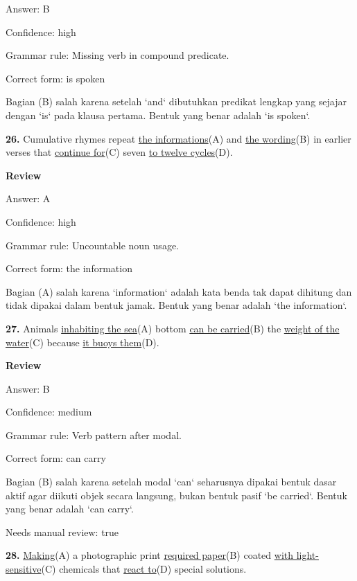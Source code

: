 \documentclass[12pt]{article}
\begin{document}
Answer: B\par
Confidence: high\par
Grammar rule: Missing verb in compound predicate.\par
Correct form: is spoken\par
Bagian (B) salah karena setelah `and` dibutuhkan predikat lengkap yang sejajar dengan `is` pada klausa pertama. Bentuk yang benar adalah `is spoken`.\par
\endgroup
\par
\vspace{\questionblockgap}
\noindent\textbf{26.} Cumulative rhymes repeat \uline{the informations}(A) and \uline{the wording}(B) in earlier verses that \uline{continue for}(C) seven \uline{to twelve cycles}(D).
\par
\begingroup
\setlength{\parskip}{0pt}
\setlength{\parindent}{0pt}
\textbf{Review}\par
Answer: A\par
Confidence: high\par
Grammar rule: Uncountable noun usage.\par
Correct form: the information\par
Bagian (A) salah karena `information` adalah kata benda tak dapat dihitung dan tidak dipakai dalam bentuk jamak. Bentuk yang benar adalah `the information`.\par
\endgroup
\par
\vspace{\questionblockgap}
\noindent\textbf{27.} Animals \uline{inhabiting the sea}(A) bottom \uline{can be carried}(B) the \uline{weight of the water}(C) because \uline{it buoys them}(D).
\par
\begingroup
\setlength{\parskip}{0pt}
\setlength{\parindent}{0pt}
\textbf{Review}\par
Answer: B\par
Confidence: medium\par
Grammar rule: Verb pattern after modal.\par
Correct form: can carry\par
Bagian (B) salah karena setelah modal `can` seharusnya dipakai bentuk dasar aktif agar diikuti objek secara langsung, bukan bentuk pasif `be carried`. Bentuk yang benar adalah `can carry`.\par
Needs manual review: true\par
\endgroup
\par
\vspace{\questionblockgap}
\noindent\textbf{28.} \uline{Making}(A) a photographic print \uline{required paper}(B) coated \uline{with light-sensitive}(C) chemicals that \uline{react to}(D) special solutions.
\end{document}
